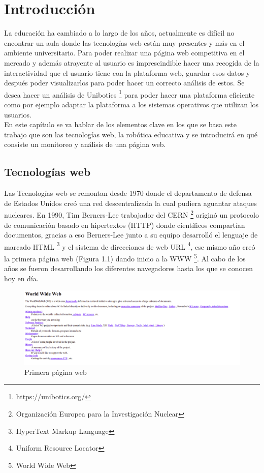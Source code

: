 \chapter{Introducción}
\label{chap:introduccion} 
La educación ha cambiado a lo largo de los años, actualmente es difícil no encontrar un aula donde las tecnologías web están muy presentes y más en el ambiente universitario. Para poder realizar una página web competitiva en el mercado y además atrayente al usuario es imprescindible hacer una recogida de la interactividad que el usuario tiene con la plataforma web, guardar esos datos y después poder visualizarlos para poder hacer un correcto análisis de estos.  Se desea hacer un análisis de Unibotics \footnote{https://unibotics.org/} para poder hacer una plataforma eficiente como por ejemplo adaptar la plataforma a los sistemas operativos que utilizan los usuarios.\\

En este capítulo se va hablar de los elementos clave en los que se basa este trabajo que son las tecnologías web, la robótica educativa y se introducirá en qué consiste un monitoreo y análisis de una página web.



\section{Tecnologías web}\label{motivacion}
Las Tecnologías web se remontan desde 1970 donde el departamento de defensa de Estados Unidos creó una red descentralizada la cual pudiera aguantar ataques nucleares. En 1990, Tim Berners-Lee trabajador del CERN \footnote{Organización Europea para​ la Investigación Nuclear} originó un protocolo de comunicación basado en hipertextos (HTTP) donde científicos compartían documentos, gracias a eso Berners-Lee junto a su equipo desarrolló el lenguaje de marcado HTML \footnote{HyperText Markup Language} y el sistema de direcciones de web URL \footnote{Uniform Resource Locator}, ese mismo año creó la primera página web (Figura 1.1) dando inicio a la WWW \footnote{World Wide Web}. Al cabo de los años se fueron desarrollando los diferentes navegadores hasta los que se conocen hoy en día. \\

\begin{figure}[H]
    \centering
    \includegraphics[width=16cm, keepaspectratio]{img/first_web_page.png}
    \caption{Primera página web}
    \label{fig:web}
\end{figure}

